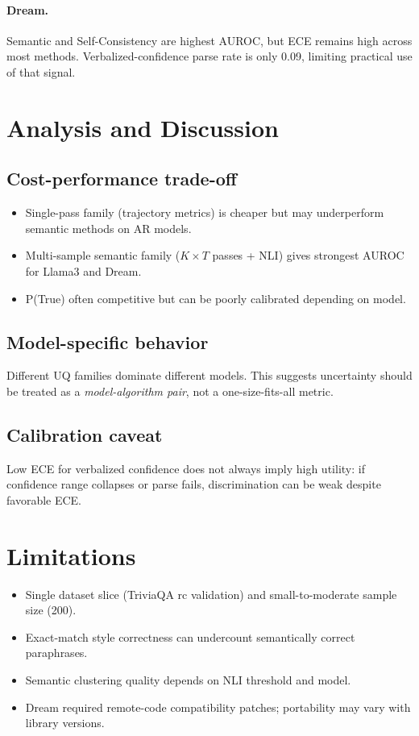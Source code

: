 \documentclass{article}
\begin{document}
\paragraph{Dream.}
Semantic and Self-Consistency are highest AUROC, but ECE remains high across most methods. Verbalized-confidence parse rate is only 0.09, limiting practical use of that signal.

\section{Analysis and Discussion}
\subsection{Cost-performance trade-off}
\begin{itemize}
\item Single-pass family (trajectory metrics) is cheaper but may underperform semantic methods on AR models.
\item Multi-sample semantic family ($K\times T$ passes + NLI) gives strongest AUROC for Llama3 and Dream.
\item P(True) often competitive but can be poorly calibrated depending on model.
\end{itemize}

\subsection{Model-specific behavior}
Different UQ families dominate different models. This suggests uncertainty should be treated as a \emph{model-algorithm pair}, not a one-size-fits-all metric.

\subsection{Calibration caveat}
Low ECE for verbalized confidence does not always imply high utility: if confidence range collapses or parse fails, discrimination can be weak despite favorable ECE.

\section{Limitations}
\begin{itemize}
\item Single dataset slice (TriviaQA rc validation) and small-to-moderate sample size (200).
\item Exact-match style correctness can undercount semantically correct paraphrases.
\item Semantic clustering quality depends on NLI threshold and model.
\item Dream required remote-code compatibility patches; portability may vary with library versions.
\end{itemize}
\end{document}
